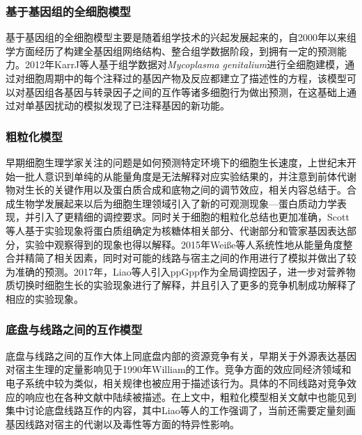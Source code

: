 \documentclass[b5paper,11pt,onecolumn,twoside,UTF8]{article}
\begin{document}
\subsubsection*{基于基因组的全细胞模型}
\indent 基于基因组的全细胞模型主要是随着组学技术的兴起发展起来的，自2000年以来组学方面经历了构建全基因组网络结构、整合组学数据阶段，到拥有一定的预测能力。2012年KarrJ等人基于组学数据对\emph{Mycoplasma genitalium}进行全细胞建模，通过对细胞周期中的每个注释过的基因产物及反应都建立了描述性的方程，该模型可以对基因组各基因与转录因子之间的互作等诸多细胞行为做出预测，在这基础上通过对单基因扰动的模拟发现了已注释基因的新功能\cite{karr2012whole}。
\subsubsection*{粗粒化模型}
\indent 早期细胞生理学家关注的问题是如何预测特定环境下的细胞生长速度，上世纪末开始一批人意识到单纯的从能量角度是无法解释对应实验结果的，并注意到前体代谢物对生长的关键作用以及蛋白质合成和底物之间的调节效应，相关内容总结于\cite{marr1991growth}。合成生物学发展起来以后为细胞生理领域引入了新的可观测现象---蛋白质动力学表现，并引入了更精细的调控要求。同时关于细胞的粗粒化总结也更加准确，Scott等人基于实验现象将蛋白质组确定为核糖体相关部分、代谢部分和管家基因表达部分，实验中观察得到的现象也得以解释\cite{Scott2010}。2015年Weiße等人系统性地从能量角度整合并精简了相关因素，同时对可能的线路与宿主之间的作用进行了模拟并做出了较为准确的预测\cite{10.1073/pnas.1416533112}。2017年，Liao等人引入ppGpp作为全局调控因子，进一步对营养物质切换时细胞生长的实验现象进行了解释，并且引入了更多的竞争机制成功解释了相应的实验现象\cite{Liao:2017b4f}。
\subsubsection*{底盘与线路之间的互作模型} %
\indent 底盘与线路之间的互作大体上同底盘内部的资源竞争有关，早期关于外源表达基因对宿主生理的定量影响见于1990年William的工作\cite{bentley1990}。竞争方面的效应同经济领域和电子系统中较为类似，相关规律也被应用于描述该行为\cite{10.1016/j.bpj.2015.06.034,10.1093/nar/gkv1280}。具体的不同线路对竞争效应的响应也在各种文献中陆续被描述\cite{gorochowski2016minimal,nikolados2019growth}。在上文中，粗粒化模型相关文献中也能见到集中讨论底盘线路互作的内容，其中Liao等人的工作强调了，当前还需要定量刻画基因线路对宿主的代谢以及毒性等方面的特异性影响\cite{Liao:2017b4f}。
\end{document}
